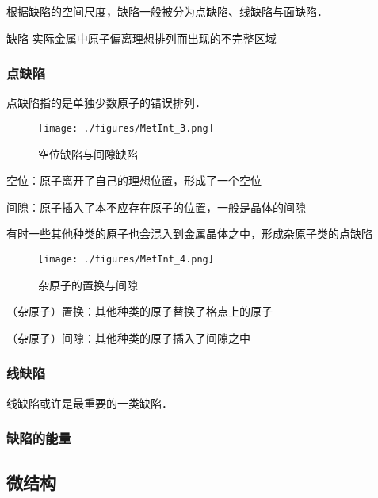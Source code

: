 根据缺陷的空间尺度，缺陷一般被分为点缺陷、线缺陷与面缺陷．

\begin{definition}{缺陷}
实际金属中原子偏离理想排列而出现的不完整区域
\end{definition}

\subsubsection{点缺陷}
点缺陷指的是单独少数原子的错误排列．
\begin{figure}[ht]
\centering
\texttt{[image: ./figures/MetInt\_3.png]}
\caption{空位缺陷与间隙缺陷} \label{MetInt_fig3}
\end{figure}
空位：原子离开了自己的理想位置，形成了一个空位

间隙：原子插入了本不应存在原子的位置，一般是晶体的间隙

有时一些其他种类的原子也会混入到金属晶体之中，形成杂原子类的点缺陷
\begin{figure}[ht]
\centering
\texttt{[image: ./figures/MetInt\_4.png]}
\caption{杂原子的置换与间隙} \label{MetInt_fig4}
\end{figure}

（杂原子）置换：其他种类的原子替换了格点上的原子

（杂原子）间隙：其他种类的原子插入了间隙之中

\subsubsection{线缺陷}
线缺陷或许是最重要的一类缺陷．

\subsubsection{缺陷的能量}

\subsection{微结构}
